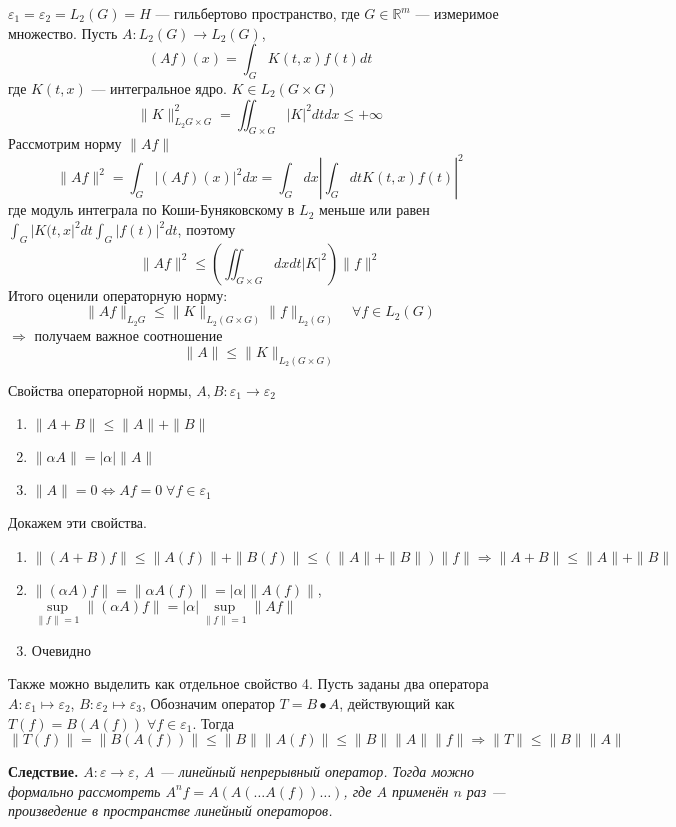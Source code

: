 \documentclass[14pt]{extarticle}
\begin{document}
\begin{Prim}
    $\varepsilon_1 = \varepsilon_2 = L_2(G) = H$ --- гильбертово пространство, где $G \in \mathbb R^m$ --- измеримое множество.
    Пусть $A : L_2(G) \to L_2(G)$, 
    $$
    (Af)(x) = \int_G K(t, x) f(t) dt
    $$
    где $K(t, x)$ --- интегральное ядро.
    $K \in L_2(G \times G) $ 
    $$
    \|K\|^2_{L_2{G \times G}} = \iint_{G \times G} |K|^2 dt dx \le +\infty
    $$
    Рассмотрим норму $\|Af\|$
    $$
    \|Af\|^2 = \int_{G} |(Af)(x)|^2 dx = \int_G dx \left| \int_G dt K(t, x) f(t) \right|^2
    $$
    где модуль интеграла по Коши-Буняковскому в $L_2$ 
    меньше или равен $\int_G |K(t, x|^2 dt \int_G |f(t)|^2 dt$, поэтому
    $$
    \|Af\|^2 \le \left(\iint_{G \times G} dx dt |K|^2 \right)\|f\|^2
    $$
    Итого оценили операторную норму:
    $$
    \|Af\|_{L_2{G}} \le \|K\|_{L_2(G \times G)}\|f\|_{L_2(G)} \quad \forall f \in L_2(G)
    $$
    $\Rightarrow$ получаем важное соотношение
    $$
    \boxed{\|A\| \le \|K\|_{L_2(G \times G)}}
    $$
\end{Prim}

Свойства операторной нормы, $A, B : \varepsilon_1 \to \varepsilon_2$
\begin{enumerate}
    \item{$\|A + B\| \le \|A\| + \|B\|$}
    \item{$\|\alpha A\| = |\alpha| \|A\|$}
    \item{$\|A\| = 0 \Leftrightarrow Af = 0 \; \forall f \in \varepsilon_1$}
\end{enumerate}
Докажем эти свойства.
\begin{enumerate}
    \item{$\|(A + B)f\| \le \|A(f)\| + \|B(f)\| \le (\|A\| + \|B\|)\|f\| \Rightarrow \|A + B\| \le \|A\| + \|B\|$}
    \item{$\|(\alpha A)f\| = \|\alpha A(f)\| = |\alpha| \|A(f)\|$, $\sup \limits_{\|f\| = 1} \|(\alpha A)f\| = |\alpha| \sup \limits_{\|f\| = 1} \|Af\|$}
    \item{Очевидно}
\end{enumerate}
Также можно выделить как отдельное свойство 4.
Пусть заданы два оператора $A : \varepsilon_1 \mapsto \varepsilon_2$, $B : \varepsilon_2 \mapsto \varepsilon_3$, Обозначим оператор $T = B \bullet A$, действующий как $T(f) = B(A(f))\; \forall f \in \varepsilon_1$.
Тогда 
$$
\|T(f)\| = \|B(A(f))\| \le \|B\|\|A(f)\| \le \|B\|\|A\|\|f\| \Rightarrow  \boxed{\|T\| \le \|B\|\|A\|}
$$

\textbf{Следствие. }
{\sl
$A : \varepsilon \to \varepsilon$, $A$ --- линейный непрерывный оператор.
Тогда можно формально рассмотреть $A^n f = A(A(\dots A(f)) \dots )$, где $A$ 
применён  $n$ раз --- произведение в пространстве линейный операторов.
}
\end{document}
